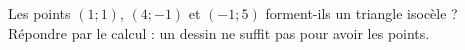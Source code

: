 
\begin{exercice}\label{exosmath-0410}

    Les points \( (1;1)\), \( (4;-1)\) et \( (-1;5)\) forment-ils un triangle isocèle ? Répondre par le calcul : un dessin ne suffit pas pour avoir les points.

\end{exercice}
